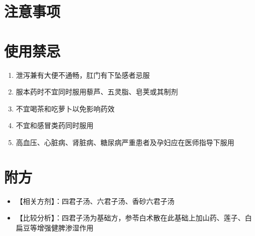 \documentclass[12pt,UTF8]{ctexbook}
\newenvironment{fangji}[1]{\section{#1}\begin{enumerate}[leftmargin=2cm]}{\end{enumerate}}
\begin{document}
\section{注意事项}
\begin{fangji}{使用禁忌}
	\item 泄泻兼有大便不通畅，肛门有下坠感者忌服
	\item 服本药时不宜同时服用藜芦、五灵脂、皂荚或其制剂
	\item 不宜喝茶和吃萝卜以免影响药效
	\item 不宜和感冒类药同时服用
	\item 高血压、心脏病、肾脏病、糖尿病严重患者及孕妇应在医师指导下服用
\end{fangji}

\section{附方}
\begin{itemize}
	\item 【相关方剂】：四君子汤、六君子汤、香砂六君子汤
	\item 【比较分析】：四君子汤为基础方，参苓白术散在此基础上加山药、莲子、白扁豆等增强健脾渗湿作用
\end{itemize}

\backmatter
\end{document}
